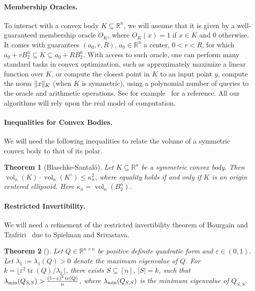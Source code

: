 \documentclass[11pt]{article}
\newtheorem{theorem}{Theorem}
\newcommand{\floor}[1]{\lfloor #1 \rfloor}
\newcommand{\R}{{\mathbb{R}}}
\newcommand\eps{\varepsilon}
\DeclareMathOperator{\vol}{vol}
\DeclareMathOperator{\tr}{tr}
\DeclarePairedDelimiter\norm{\lVert}{\rVert}
\begin{document}
\paragraph{\bf Membership Oracles.} To interact with a convex body $K \subseteq
\R^n$, we will assume that it is given by a well-guaranteed membership oracle
$O_K$, where $O_K(x) = 1$ if $x \in K$ and $0$ otherwise. It comes with
guarantees $(a_0,r,R)$, $a_0 \in \R^n$ a center, $0 < r < R$, for which $a_0 +
rB_2^n \subseteq K \subseteq a_0 + RB_2^n$. With access to such oracle, one can
perform many standard tasks in convex optimization, such as approximately
maximize a linear function over $K$, or compute the closest point in $K$ to an
input point $y$, compute the norm $\norm{x}_K$ (when $K$ is symmetric), using a
polynomial number of queries to the oracle and arithmetic operations. See for
example~\cite{GLS} for a reference. All our algorithms will rely upon the real
model of computation.  

\paragraph{\bf Inequalities for Convex Bodies.} We will need the following
inequalities to relate the volume of a symmetric convex body to that of its
polar.

\begin{theorem}[Blaschke-Santal{\'o}]\label{thm:santalo} 
Let $K \subseteq \R^n$ be a symmetric convex body. Then $\vol_n(K)\cdot
\vol_n(K^\circ) \leq \kappa_n^2$, where equality holds if and only if $K$ is
an origin centered ellipsoid. Here $\kappa_n = \vol_n(B_2^n)$.
\end{theorem}

\paragraph{\bf Restricted Invertibility.}

We will need a refinement of the restricted invertibility theorem of Bourgain
and Tzafriri~\cite{bour-tza} due to Spielman and Srivastava.

\begin{theorem}[\cite{bt-constructive}]\label{thm:rest-inv}
Let $Q \in \R^{n \times n}$ be positive definite quadratic form and $\eps \in
(0,1)$. Let $\lambda_1 := \lambda_1(Q) > 0$ denote the maximum eigenvalue of
$Q$.  For $k = \floor{\eps^2 \tr(Q)/\lambda_1}$, there exists $S \subseteq [n]$,
$|S|=k$, such that $\lambda_{\rm min}(Q_{S,S}) > \frac{(1-\eps)^2\tr(Q)}{n}$,
where $\lambda_{\rm min}(Q_{S,S})$ is the minimum eigenvalue of $Q_{S,S}$.
\end{theorem}
\end{document}
